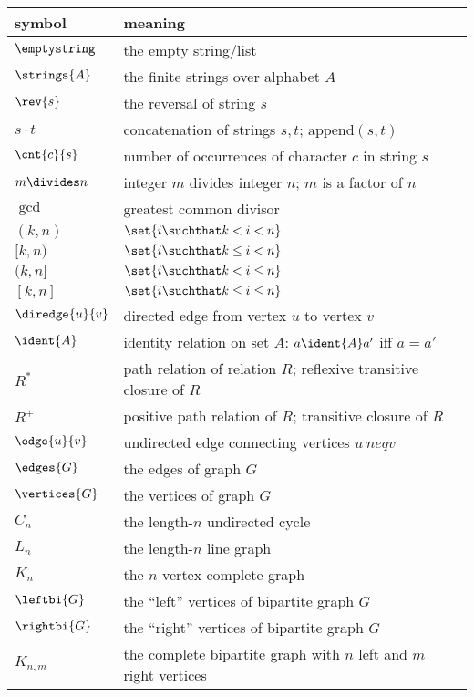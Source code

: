 \begin{center}
\begin{tabular}{ll}
symbol         &  meaning\\
\hline
$\emptystring$ & the empty string/list\\
$\strings{A}$  & the finite strings over alphabet $A$\\
$\rev{s}$      & the reversal of string $s$\\
$s \cdot t$    & concatenation of strings $s,t$; $\text{append}(s,t)$\\
$\cnt{c}{s}$   & number of occurrences of character $c$ in string $s$\\
$m \divides n$ & integer $m$ divides integer $n$; $m$ is a factor of $n$\\
$\gcd{}{}$     & greatest common divisor\\
$(k, n)$       & $\set{i \suchthat k < i < n}$\\
$[k, n)$       & $\set{i \suchthat k \le i < n}$\\
$(k, n]$       & $\set{i \suchthat k < i \le n}$\\
$[k,n]$        & $\set{i \suchthat k \le i \le n}$\\
$\diredge{u}{v}$ & directed edge from vertex $u$ to vertex $v$\\
$\ident{A}$    & identity relation on set $A$: $a \ident{A} a'$ iff $a = a'$\\
$R^*$          & path relation of relation $R$; reflexive transitive closure of $R$\\
$R^+$          & positive path relation of $R$; transitive closure of $R$\\
$\edge{u}{v}$  & undirected edge connecting vertices $u\ neq v$\\
$\edges{G}$    & the edges of graph $G$\\
$\vertices{G}$ & the vertices of graph $G$\\
$C_n$          & the length-$n$ undirected cycle\\
$L_n$          & the length-$n$ line graph\\
$K_n$          & the $n$-vertex complete graph\\
$\leftbi{G}$   & the ``left'' vertices of bipartite graph $G$\\
$\rightbi{G}$  & the ``right'' vertices of bipartite graph $G$\\
$K_{n,m}$       & the complete bipartite graph with $n$ left and $m$ right vertices
\end{tabular}
\end{center}
